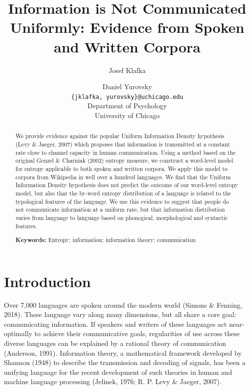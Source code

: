 \documentclass[10pt, letterpaper]{article}
\title{Information is Not Communicated Uniformly: Evidence from Spoken and
Written Corpora}
\author{Josef Klafka \and Daniel Yurovsky \\
        \texttt{\{jklafka, yurovsky\}@uchicago.edu} \\
       Department of Psychology \\ University of Chicago}
\begin{document}
\maketitle

\begin{abstract}
We provide evidence against the popular Uniform Information Density
hypothesis (Levy \& Jaeger, 2007) which proposes that information is
transmitted at a constant rate close to channel capacity in human
communication. Using a method based on the original Genzel \& Charniak
(2002) entropy measure, we construct a word-level model for entropy
applicable to both spoken and written corpora. We apply this model to
corpora from Wikipedia in well over a hundred languages. We find that
the Uniform Information Density hypothesis does not predict the outcome
of our word-level entropy model, but also that the by-word entropy
distribution of a language is related to the typological features of the
language. We use this evidence to suggest that people do not communicate
information at a uniform rate, but that information distribution varies
from language to language based on phonogical, morphological and
syntactic features.

\textbf{Keywords:}
Entropy; information; information theory; communication
\end{abstract}

\section{Introduction}\label{introduction}

Over 7,000 languages are spoken around the modern world (Simons \&
Fenning, 2018). These language vary along many dimensions, but all share
a core goal: communicating information. If speakers and writers of these
languages act near-optimally to achieve their communicative goals,
regularities of use across these diverse languages can be explained by a
rational theory of communication (Anderson, 1991). Information theory, a
mathematical framework developed by Shannon (1948) to describe the
transmission and decoding of signals, has been a unifying language for
the recent development of such theories in human and machine language
processing (Jelinek, 1976; R. P. Levy \& Jaeger, 2007).
\end{document}
